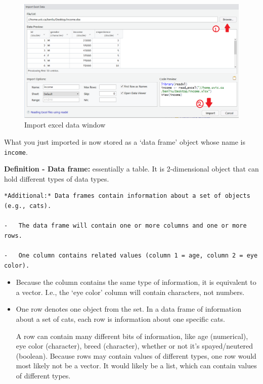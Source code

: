 \documentclass[
]{article}
\begin{document}
\begin{figure}
\centering
\includegraphics{images/rstudio-17.png}
\caption{Import excel data window}
\end{figure}

What you just imported is now stored as a `data frame' object whose name
is \texttt{income}.

\textbf{Definition - Data frame:} essentially a table. It is
2-dimensional object that can hold different types of data types.

\begin{verbatim}
*Additional:* Data frames contain information about a set of objects (e.g., cats).

-   The data frame will contain one or more columns and one or more rows.

-   One column contains related values (column 1 = age, column 2 = eye color).
\end{verbatim}

\begin{itemize}
\item
  Because the column contains the same type of information, it is
  equivalent to a vector. I.e., the `eye color' column will contain
  characters, not numbers.
\item
  One row denotes one object from the set. In a data frame of
  information about a set of cats, each row is information about one
  specific cats.

  A row can contain many different bits of information, like age
  (numerical), eye color (character), breed (character), whether or not
  it's spayed/neutered (boolean). Because rows may contain values of
  different types, one row would most likely not be a vector. It would
  likely be a list, which can contain values of different types.
\end{itemize}
\end{document}
